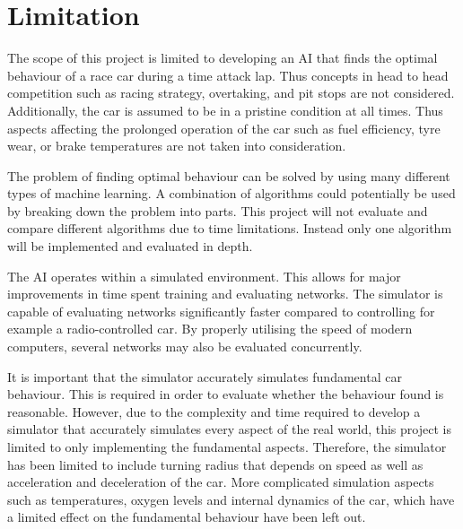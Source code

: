 \section{Limitation}
The scope of this project is limited to developing an AI that finds the optimal behaviour of a race car during a time attack lap. Thus concepts in head to head competition such as racing strategy, overtaking, and pit stops are not considered. Additionally, the car is assumed to be in a pristine condition at all times. Thus aspects affecting the prolonged operation of the car such as fuel efficiency, tyre wear, or brake temperatures are not taken into consideration. 

The problem of finding optimal behaviour can be solved by using many different types of machine learning. A combination of algorithms could potentially be used by breaking down the problem into parts. This project will not evaluate and compare different algorithms due to time limitations. Instead only one algorithm will be implemented and evaluated in depth.


The AI operates within a simulated environment. This allows for major improvements in time spent training and evaluating networks. The simulator is capable of evaluating networks significantly faster compared to controlling for example a radio-controlled car. By properly utilising the speed of modern computers, several networks may also be evaluated concurrently. 

It is important that the simulator accurately simulates fundamental car behaviour. This is required in order to evaluate whether the behaviour found is reasonable. However, due to the complexity and time required to develop a simulator that accurately simulates every aspect of the real world, this project is limited to only implementing the fundamental aspects. Therefore, the simulator has been limited to include turning radius that depends on speed as well as acceleration and deceleration of the car. More complicated simulation aspects such as temperatures, oxygen levels and internal dynamics of the car, which have a limited effect on the fundamental behaviour have been left out.

